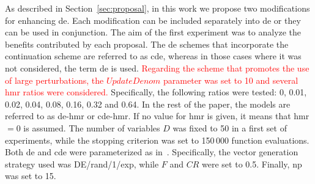 \documentclass[preprint,3p]{elsarticle}
\newcommand{\CDE}{c{\sc de}}
\newcommand{\DE}{{\sc de}}
\newcommand{\HMR}{{\sc hmr}}
\newcommand{\NP}{{\sc np}}
\begin{document}
As described in Section~\ref{sec:proposal}, in this work we propose two modifications for enhancing \DE{}.
%
Each modification can be included separately into \DE{} or they can be used in conjunction.
%
The aim of the first experiment was to analyze the benefits contributed by each proposal.
%
The \DE{} schemes that incorporate the continuation scheme are referred to as \CDE{}, whereas in those cases where it
was not considered, the term \DE{} is used.
%
\textcolor{red}{
Regarding the scheme that promotes the use of large perturbations, the $UpdateDenom$ parameter was set to 10 and
several \HMR{} ratios were considered.
}
%
Specifically, the following ratios were tested: 0, 0.01, 0.02, 0.04, 0.08, 0.16, 0.32 and 0.64.
%
In the rest of the paper, the models are referred to as \DE{}-\HMR{} or \CDE{}-\HMR{}.
%
If no value for \HMR{} is given, it means that \HMR{} $ = 0$ is assumed.
%
The number of variables $D$ was fixed to 50 in a first set of experiments,
while the stopping criterion was set to 150$\,$000 function evaluations.
%
Both \DE{} and \CDE{} were parameterized as in~\cite{LaTorre:11}.
%
Specifically, the vector generation strategy used was DE/rand/1/exp, while
$F$ and $CR$ were set to 0.5.
%
Finally, \NP{} was set to 15.
\end{document}
